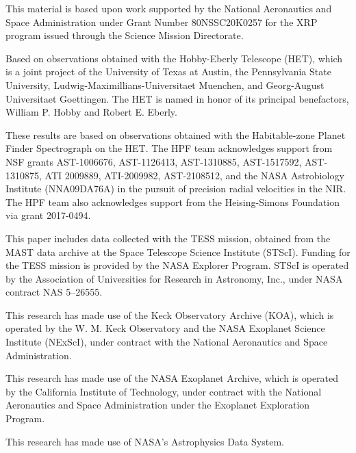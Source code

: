 \documentclass[twocolumn]{aastex631}
\begin{document}
\begin{acknowledgements}

    This material is based upon work supported by the National Aeronautics and Space Administration under Grant Number 80NSSC20K0257 for the XRP program issued through the Science Mission Directorate.

    Based on observations obtained with the Hobby-Eberly Telescope (HET), which is a joint project of the University of Texas at Austin, the Pennsylvania State University, Ludwig-Maximillians-Universitaet Muenchen, and Georg-August Universitaet Goettingen. The HET is named in honor of its principal benefactors, William P. Hobby and Robert E. Eberly.

    These results are based on observations obtained with the Habitable-zone Planet Finder Spectrograph on the HET. The HPF team acknowledges support from NSF grants AST-1006676, AST-1126413, AST-1310885, AST-1517592, AST-1310875, ATI 2009889, ATI-2009982, AST-2108512, and the NASA Astrobiology Institute (NNA09DA76A) in the pursuit of precision radial velocities in the NIR. The HPF team also acknowledges support from the Heising-Simons Foundation via grant 2017-0494.

    This paper includes data collected with the TESS mission, obtained from the MAST data archive at the Space Telescope Science Institute (STScI). Funding for the TESS mission is provided by the NASA Explorer Program. STScI is operated by the Association of Universities for Research in Astronomy, Inc., under NASA contract NAS 5–26555.

    This research has made use of the Keck Observatory Archive (KOA), which is operated by the W. M. Keck Observatory and the NASA Exoplanet Science Institute (NExScI), under contract with the National Aeronautics and Space Administration.

    This research has made use of the NASA Exoplanet Archive, which is operated by the California Institute of Technology, under contract with the National Aeronautics and Space Administration under the Exoplanet Exploration Program.

    This research has made use of NASA's Astrophysics Data System.
\end{acknowledgements}




\clearpage



\end{document}

